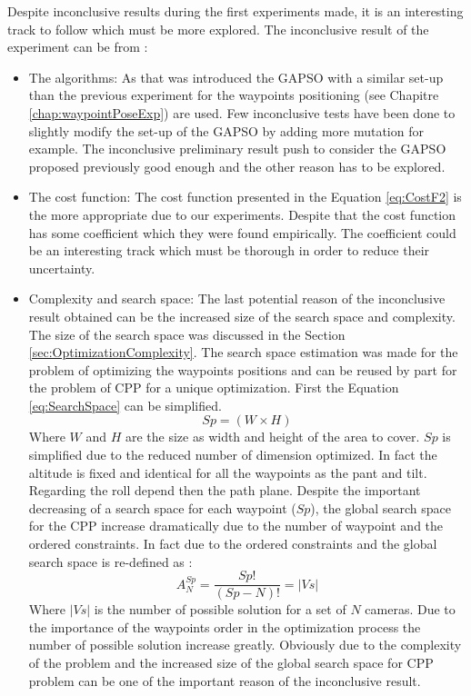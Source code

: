 		
		Despite inconclusive results during the first experiments made, it is an interesting track to follow  which must  be more explored.  
		The inconclusive result of the experiment can be from : %
		\begin{itemize}
		\item The algorithms: As that was introduced the GAPSO  with a similar set-up than the previous experiment for the waypoints positioning (see Chapitre \ref{chap:waypointPoseExp}) are used. Few inconclusive tests have been done to slightly modify the set-up of the GAPSO by adding more mutation for example. The inconclusive preliminary result push to consider the GAPSO proposed previously good enough and the other reason has to be explored.
		\item The cost function: The cost function presented in the Equation \ref{eq:CostF2} is the more appropriate due to our experiments. Despite that the cost function has some coefficient which they were found empirically. The coefficient could be an interesting track which must be thorough in order to reduce their uncertainty.
		\item Complexity and search space: 
		The last potential reason of the inconclusive result obtained can be the increased size of the search space and complexity. The size of the search space was discussed in the Section \ref{sec:OptimizationComplexity}. The search space estimation was made for the problem of optimizing the waypoints positions and can be reused by part for the problem of CPP for a unique optimization. First the Equation \ref{eq:SearchSpace} can be simplified.  
		\begin{equation} \label{eq:SearchSpaceCPP}
		 Sp=(W\times H)  
		\end{equation}
		Where $W$ and $H$ are the size as width and height of the area to cover. $Sp$  is simplified due to the reduced number of dimension optimized. In fact the altitude is fixed and identical for all the waypoints as the pant and tilt. Regarding the roll depend then the path plane.
		Despite the important decreasing of a search space for each waypoint ($Sp$), the global search space for the CPP increase dramatically  due to the number of waypoint and  the ordered constraints. In fact due to the ordered constraints and the  global search space is re-defined as :
		\begin{equation} \label{eq:ArrangmentCPP}
			A^{Sp}_{N}=\frac{Sp!}{(Sp-N)!} = |Vs|
		\end{equation}
 Where $|Vs|$ is the number of possible solution for a set of $N$ cameras. Due to the importance of the waypoints order in the optimization process the number of possible solution increase greatly. Obviously due to the complexity of the problem and the increased size of the global search space for CPP problem  can be one of the important reason of the inconclusive result.
 \end{itemize}
		
